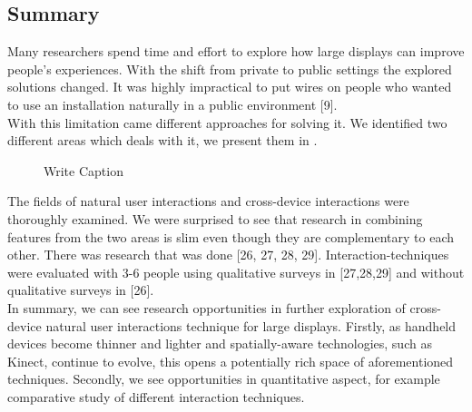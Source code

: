 \subsection{Summary}
Many researchers spend time and effort to explore how large displays can improve people's experiences. 
With the shift from private to public settings the explored solutions changed. 
It was highly impractical to put wires on people who wanted to use an installation naturally in a public environment [9].\\

With this limitation came different approaches for solving it. 
We identified two different areas which deals with it, we present them in .

\begin{figure}[h!]
\centering
{}
\caption{Write Caption}
\label{fig:litreview}
\end{figure}

The fields of natural user interactions and cross-device interactions were thoroughly examined. 
We were surprised to see that research in combining features from the two areas is slim even though they are complementary to each other. 
There was research that was done [26, 27, 28, 29]. 
Interaction-techniques were evaluated with 3-6 people using qualitative surveys in [27,28,29] and without qualitative surveys in [26].\\

In summary, we can see research opportunities in further exploration of cross-device natural user interactions technique for large displays. 
Firstly, as handheld devices become thinner and lighter and spatially-aware technologies, such as Kinect, continue to evolve, this opens a potentially rich space of aforementioned techniques. 
Secondly, we see opportunities in quantitative aspect, for example comparative study of different interaction techniques. 
